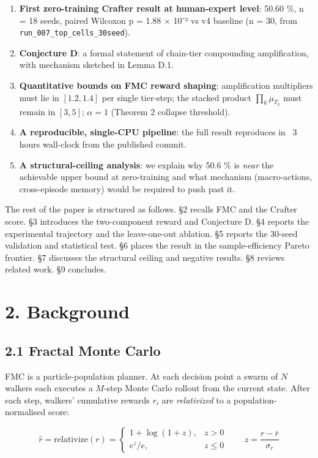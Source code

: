 \begin{enumerate}
\item \textbf{First zero-training Crafter result at human-expert level}: 50.60 \%, n = 18 seeds, paired Wilcoxon p = 1.88 × 10⁻³ vs v4 baseline (n = 30, from \texttt{run\_007\_top\_cells\_30seed}).
\item \textbf{Conjecture D}: a formal statement of chain-tier compounding amplification, with mechanism sketched in Lemma D.1.
\item \textbf{Quantitative bounds on FMC reward shaping}: amplification multipliers must lie in $[1.2, 1.4]$ per single tier-step; the stacked product $\prod_k \mu_{T_k}$ must remain in $[3, 5]$; $\alpha = 1$ (Theorem 2 collapse threshold).
\item \textbf{A reproducible, single-CPU pipeline}: the full result reproduces in ~3 hours wall-clock from the published commit.
\item \textbf{A structural-ceiling analysis}: we explain why 50.6 \% is \emph{near} the achievable upper bound at zero-training and what mechanism (macro-actions, cross-episode memory) would be required to push past it.
\end{enumerate}
The rest of the paper is structured as follows. §2 recalls FMC and the
Crafter score. §3 introduces the two-component reward and Conjecture D.
§4 reports the experimental trajectory and the leave-one-out ablation.
§5 reports the 30-seed validation and statistical test. §6 places the
result in the sample-efficiency Pareto frontier. §7 discusses the
structural ceiling and negative results. §8 reviews related work. §9
concludes.

\hrulefill

\section{2. Background}

\subsection{2.1 Fractal Monte Carlo}

FMC is a particle-population planner. At each decision point a swarm of
$N$ walkers each executes a $M$-step Monte Carlo rollout from the
current state. After each step, walkers' cumulative rewards $r_i$ are
\emph{relativized} to a population-normalised score:

\[
\widehat{r} = \mathrm{relativize}(r) =
\begin{cases}
1 + \log(1 + z), & z > 0 \\[2pt]
e^z / e, & z \le 0
\end{cases}
\qquad z = \frac{r - \bar r}{\sigma_r}
\]

